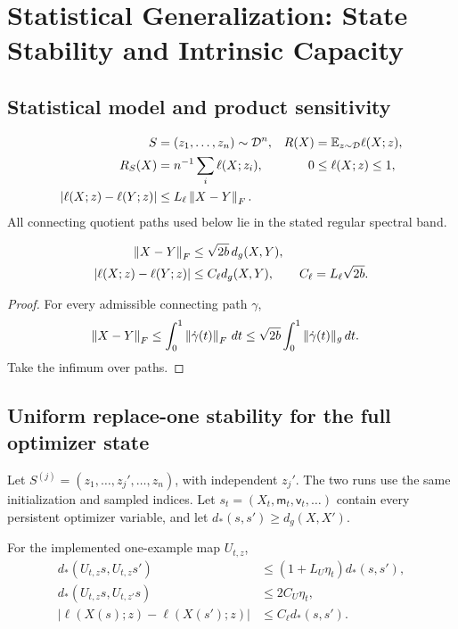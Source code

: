 \section{Statistical Generalization: State Stability and Intrinsic Capacity}
\label{app:generalization}
\subsection{Statistical model and product sensitivity}
\begin{assumption}
\begin{align}
S&=(z_1,\ldots,z_n)\sim\mathcal D^n,&
R(X)&=\mathbb E_{z\sim\mathcal D}\ell(X;z),\\
R_S(X)&=n^{-1}\sum_i\ell(X;z_i),&
0&\leq\ell(X;z)\leq1,\\
|\ell(X;z)-\ell(Y;z)|&\leq L_\ell\left\lVert X-Y\right\rVert_F.
\label{eq:rigid-statistical-model}
\end{align}
All connecting quotient paths used below lie in the stated regular spectral band.
\end{assumption}

\begin{lemma}
\begin{align}
\left\lVert X-Y\right\rVert_F&\leq\sqrt{2b}\,d_g(X,Y),\\
|\ell(X;z)-\ell(Y;z)|
&\leq C_\ell d_g(X,Y),\qquad C_\ell=L_\ell\sqrt{2b}.
\end{align}
\end{lemma}
\begin{proof}
For every admissible connecting path $\gamma$,
\begin{align}
\left\lVert X-Y\right\rVert_F&\leq\int_0^1\left\lVert\dot\gamma(t)\right\rVert_F\,dt
\leq\sqrt{2b}\int_0^1\|\dot\gamma(t)\|_g\,dt .
\end{align}
Take the infimum over paths.
\end{proof}

\subsection{Uniform replace-one stability for the full optimizer state}
\begin{definition}
Let $S^{(j)}=(z_1,\ldots,z_j',\ldots,z_n)$, with independent $z_j'$.
The two runs use the same initialization and sampled indices.
Let $s_t=(X_t,\mathsf m_t,\mathsf v_t,\ldots)$ contain every persistent
optimizer variable, and let $d_*(s,s')\geq d_g(X,X')$.
\end{definition}
\begin{assumption}
For the implemented one-example map $U_{t,z}$,
\begin{align}
d_*(U_{t,z}s,U_{t,z}s')&\leq(1+L_U\eta_t)d_*(s,s'),\\
d_*(U_{t,z}s,U_{t,z'}s)&\leq2C_U\eta_t,\\
|\ell(X(s);z)-\ell(X(s');z)|&\leq C_\ell d_*(s,s').
\label{eq:rigid-state-regularity}
\end{align}
\end{assumption}


